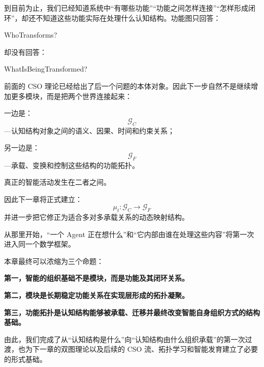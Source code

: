到目前为止，我们已经知道系统中“有哪些功能”“功能之间怎样连接”“怎样形成闭环”，却还不知道这些功能实际在处理什么认知结构。功能图只回答：
\begin{statementbox}
WhoTransforms?
\end{statementbox}
却没有回答：
\begin{statementbox}
WhatIsBeingTransformed?
\end{statementbox}

前面的 CSO 理论已经给出了后一个问题的本体对象。因此下一步自然不是继续增加更多模块，而是把两个世界连接起来：

一边是：
\[
\mathcal G_C
\]
---认知结构对象之间的语义、因果、时间和约束关系；

另一边是：
\[
\mathcal G_F
\]
---承载、变换和控制这些结构的功能拓扑。

真正的智能活动发生在二者之间。

因此下一章将正式建立：
\[
\boxed{
\mu_t:
\mathcal G_C
\longrightarrow
\mathcal G_F
}
\]
并进一步把它修正为适合多对多承载关系的动态映射结构。

从那里开始，“一个 Agent 正在想什么”和“它内部由谁在处理这些内容”将第一次进入同一个数学框架。

本章最终可以浓缩为三个命题：

\begin{proposition*}
\bfseries 第一，智能的组织基础不是模块，而是功能及其闭环关系。
\end{proposition*}

\begin{statementbox}
\bfseries 第二，模块是长期稳定功能关系在实现层形成的拓扑凝聚。
\end{statementbox}

\begin{statementbox}
\bfseries 第三，功能拓扑是认知结构能够被承载、迁移并最终改变智能自身组织方式的结构基础。
\end{statementbox}

由此，我们完成了从“认知结构是什么”向“认知结构由什么组织承载”的第一次过渡，也为下一章的双图理论以及后续的 CSO 流、拓扑学习和智能发育建立了必要的形式基础。
